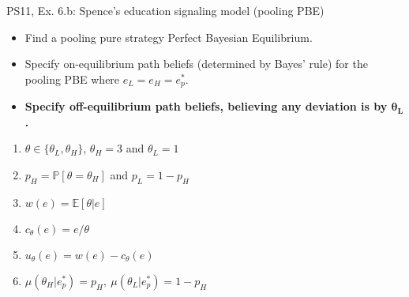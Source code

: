 \begin{frame}{PS11, Ex. 6.b: Spence’s education signaling model (pooling PBE)}
    \begin{itemize}
      \item[(b)] Find a pooling pure strategy Perfect Bayesian Equilibrium.
    \end{itemize}\vspace{-8pt}
    \begin{multicols}{2}
      \begin{itemize}
        \item[Step 1:] Specify on-equilibrium path beliefs (determined by Bayes' rule) for the pooling PBE where $e_L=e_H=e_p^*$.
        \item[Step 2:] \textbf{Specify off-equilibrium path beliefs, believing any deviation is by $\bm{\theta_L}$.}
      \end{itemize}
      \vfill\null\columnbreak
      \begin{enumerate}
        \item[Types:] $\theta\in\{\theta_L,\theta_H\}$, $\theta_H=3$ and $\theta_L=1$
        \item[Prob.:] $p_H=\mathbb{P}[\theta=\theta_H]$ and $p_L=1-p_H$
        \item[Wage:] $w(e)=\mathbb{E}[\theta|e]$
        \item[Cost:] $c_\theta(e)=e/\theta$
        \item[Utility:] $u_\theta(e)=w(e)-c_\theta(e)$
        \item $\mu\left(\theta_H|e_p^*\right)=p_H,\
               \mu\left(\theta_L|e_p^*\right)=1-p_H$
      \end{enumerate}
      \vfill\null
    \end{multicols}
\end{frame}
